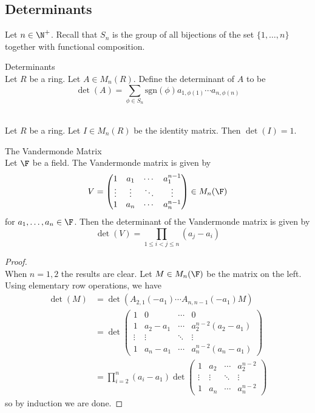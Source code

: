 \documentclass[a4paper]{article}
\begin{document}
\subsection{Determinants}
Let $n\in\N^+$. Recall that $S_n$ is the group of all bijections of the set $\{1,\dots,n\}$ together with functional composition. 

\begin{defn}{Determinants}{}\\
Let $R$ be a ring. Let $A\in M_n(R)$. Define the determinant of $A$ to be $$\det(A)=\sum_{\phi\in S_n}\text{sgn}(\phi)a_{1,\phi(1)}\cdots a_{n,\phi(n)}$$
\end{defn}

\begin{eg}{}{}\\
Let $R$ be a ring. Let $I\in M_n(R)$ be the identity matrix. Then $\det(I)=1$. 
\end{eg}

\begin{eg}{The Vandermonde Matrix}{}\\
Let $\F$ be a field. The Vandermonde matrix is given by $$V=\begin{pmatrix}
1 & a_1 & \cdots & a_1^{n-1}\\
\vdots & \vdots & \ddots & \vdots\\
1 & a_n & \cdots & a_n^{n-1}
\end{pmatrix}\in M_n(\F)$$ for $a_1,\dots,a_n\in\F$. Then the determinant of the Vandermonde matrix is given by $$\det(V)=\prod_{1\leq i<j\leq n}(a_j-a_i)$$
\begin{proof}\\
When $n=1,2$ the results are clear. Let $M\in M_n(\F)$ be the matrix on the left. Using elementary row operations, we have 
\begin{align*}
\det(M)&=\det(A_{2,1}(-a_1)\cdots A_{n,n-1}(-a_1)M)\\
&=\det\begin{pmatrix}
1 & 0 & \cdots & 0\\
1 & a_2-a_1 & \cdots & a_2^{n-2}(a_2-a_1)\\
\vdots & \vdots & \ddots & \vdots\\
1 & a_n-a_1 & \cdots & a_n^{n-2}(a_n-a_1)
\end{pmatrix}\\
&=\prod_{i=2}^n(a_i-a_1)\det\begin{pmatrix}
1 & a_2 & \cdots & a_2^{n-2}\\
\vdots & \vdots & \ddots & \vdots\\
1 & a_n & \cdots & a_n^{n-2}
\end{pmatrix}
\end{align*}
so by induction we are done. 
\end{proof}
\end{eg}
\end{document}
